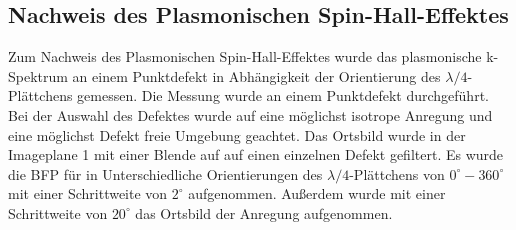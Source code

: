 \documentclass[titlepage]{article}
\begin{document}
	
	\subsection{Nachweis des Plasmonischen Spin-Hall-Effektes}
	Zum Nachweis des Plasmonischen Spin-Hall-Effektes wurde das plasmonische k-Spektrum an einem Punktdefekt in Abhängigkeit der Orientierung des $\lambda /4$-Plättchens gemessen. Die Messung wurde an einem Punktdefekt durchgeführt. Bei der Auswahl des Defektes wurde auf eine möglichst isotrope Anregung und eine möglichst Defekt freie Umgebung geachtet. Das Ortsbild wurde in der Imageplane 1 mit einer Blende auf auf einen einzelnen Defekt gefiltert. Es wurde die BFP für in Unterschiedliche Orientierungen des $\lambda/4$-Plättchens von $0^\circ-360^\circ$ mit einer Schrittweite von $2^\circ$ aufgenommen. Außerdem wurde mit einer Schrittweite von $20^\circ$ das Ortsbild der Anregung aufgenommen.
	
\end{document}
